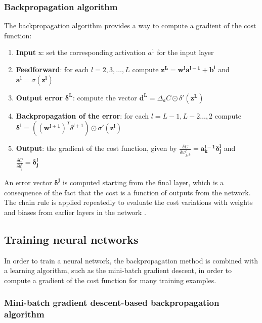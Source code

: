 \subsubsection{Backpropagation algorithm}

The backpropagation algorithm provides a way to compute a gradient of the cost function:

\begin{enumerate}
\item \textbf{Input} x: set the corresponding activation $a^1$ for the input layer
\item \textbf{Feedforward}: for each $l = 2, 3, \dots, L$ compute $\boldsymbol{z^L} = \boldsymbol{w^l}\boldsymbol{a^{l-1}} + \boldsymbol{b^l}$ and $\boldsymbol{a^l} = \sigma(\boldsymbol{z^l})$
\item \textbf{Output error} $\boldsymbol{\delta^L}$: compute the vector $\boldsymbol{d^L} = \Delta_a C  \odot \delta'(\boldsymbol{z^L})$
\item \textbf{Backpropagation of the error}: for each $l = L - 1, L - 2 \dots, 2$ compute $\boldsymbol{\delta^l} = ((\boldsymbol{w^{l+1}})^T \delta^{l+1}) \odot \sigma'(\boldsymbol{z^l})$ 
\item \textbf{Output}: the gradient of the cost function, given by $\frac{\delta C}{\delta w^l_{j, k}} = \boldsymbol{a^{l-1}_k \delta^l_j}$ and $\frac{\delta C}{\delta b_j^l} = \boldsymbol{\delta^l_j}$
\end{enumerate}

An error vector $\boldsymbol{\delta^j}$ is computed starting from the final layer, which is a consequence of the fact that the cost is a function of outputs from the network. The chain rule is applied repeatedly to evaluate the cost variations with weights and biases from earlier layers in the network \cite{backpropagation_nielsen}.

\subsection{Training neural networks}


In order to train a neural network, the backpropagation method is combined with a learning algorithm, such as the mini-batch gradient descent, in order to compute a gradient of the cost function for many training examples.

\subsubsection{Mini-batch gradient descent-based backpropagation algorithm}

